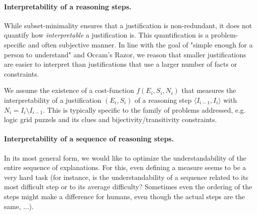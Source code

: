 
\paragraph{Interpretability of a reasoning steps.}
While subset-minimality ensures that a justification is non-redundant, it does not quantify how \textit{interpretable} a justification is. 
This quantification is a problem-specific and often subjective manner. In line with the goal of "simple enough for a person to understand" and Occam's Razor, we reason that smaller justifications are easier to interpret than justifications that use a larger number of facts or constraints. %

We assume the existence of a cost-function $f(E_i,S_i,N_i)$ that measures the interpretability of a justification $(E_i,S_i)$ of a reasoning step $\langle I_{i-1}, I_i \rangle$ with $N_i = I_i \setminus I_{i-1}$. This is typically specific to the family of problems addressed, e.g. logic grid puzzels and its clues and bijectivity/transitivity constraints.

\paragraph{Interpretability of a sequence of reasoning steps.}
In its most general form, we would like to optimize the understandability of the entire sequence of explanations. 
For this, even defining a measure seems to be a very hard task (for instance, is the understandability of a sequence related to its most difficult step or to its average difficulty? Sometimes even the ordering of the steps might make a difference for humans, even though the actual steps are the same, ...). 

